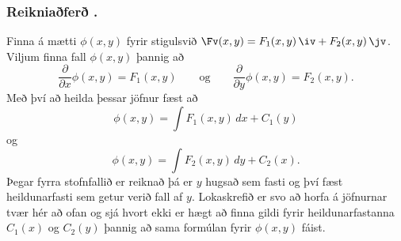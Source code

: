 \subsubsection{Reikniaðferð \kaflanr.}
 Finna á mætti $\phi(x,y)$ fyrir stigulsvið  $\Fv(x,y)=F_1(x,y)\,\iv+F_2(x,y)\,\jv$.  Viljum finna fall $\phi(x,y)$ þannig að 
$$\frac{\partial}{\partial x}\phi(x,y)=F_1(x,y)\qquad
\mbox{og}\qquad \frac{\partial}{\partial y}\phi(x,y)=F_2(x,y).$$
 Með því að heilda þessar jöfnur fæst að 
 $$\phi(x,y)=\int F_1(x,y)\,dx+C_1(y)$$
og
$$\phi(x,y)=\int F_2(x,y)\,dy+C_2(x).$$
Þegar fyrra stofnfallið er reiknað þá er $y$ hugsað sem fasti og því fæst heildunarfasti sem getur verið fall af $y$.  Lokaskrefið er  svo að horfa á jöfnurnar tvær hér að ofan og sjá hvort ekki er hægt að finna gildi fyrir heildunarfastanna $C_1(x)$ og $C_2(y)$ þannig að sama formúlan fyrir $\phi(x,y)$ fáist.  





